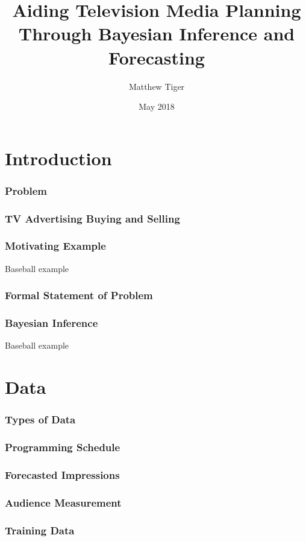 \documentclass{beamer}
\title{Aiding Television Media Planning Through Bayesian Inference and Forecasting}
\author{Matthew Tiger}
\institute{Towson University}
\date{May 2018}
\begin{document}
\frame{\titlepage}

\frame{\tableofcontents}


\section{Introduction}

\begin{frame}
\frametitle{Problem}

\end{frame}

\begin{frame}
\frametitle{TV Advertising Buying and Selling}
\end{frame}

\begin{frame}
\frametitle{Motivating Example}
Baseball example
\end{frame}

\begin{frame}
\frametitle{Formal Statement of Problem}
\end{frame}

\begin{frame}
\frametitle{Bayesian Inference}
Baseball example
\end{frame}


\section{Data}

\begin{frame}
\frametitle{Types of Data}
\end{frame}

\begin{frame}
\frametitle{Programming Schedule}
\end{frame}

\begin{frame}
\frametitle{Forecasted Impressions}
\end{frame}

\begin{frame}
\frametitle{Audience Measurement}
\end{frame}

\begin{frame}
\frametitle{Training Data}
\end{frame}
\end{document}
